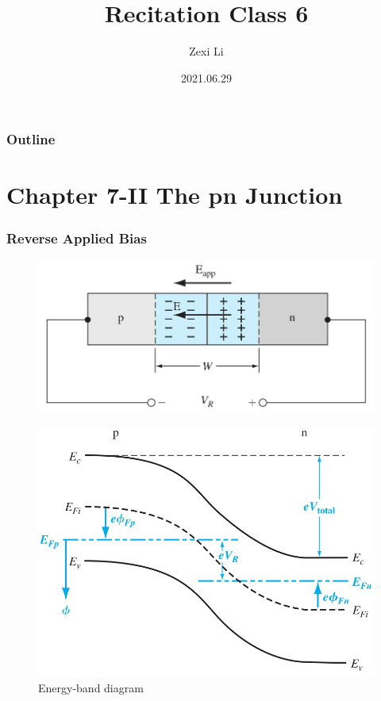 \documentclass{beamer}
\begin{document}
\renewcommand{\d}{\: \mathrm{d} }
\newcommand{\e}{\mathrm{e}}


\title[] {Recitation Class 6}

\author[lzx]{Zexi Li}


\date{2021.06.29}

\frame{\titlepage}


\begin{frame}
    \frametitle{Outline}
    \tableofcontents
\end{frame}

\section{Chapter 7-II The pn Junction}
    \begin{frame} \frametitle{Reverse Applied Bias}
        \begin{figure}[H]
            \centering
            \includegraphics[width=0.5\linewidth]{Reversed-biase-graph.jpg}
            \label{fig:Reversed-biase-graph.jpg}
        \end{figure}
        \begin{figure}[H]
            \centering
            \includegraphics[width=0.5\linewidth]{Energy-band-diagram-reversed-biase.jpg}
            \caption{Energy-band diagram}
            \label{fig:Energy-band-diagram-reversed-biase.jpg}
        \end{figure}
    \end{frame}
\end{document}
